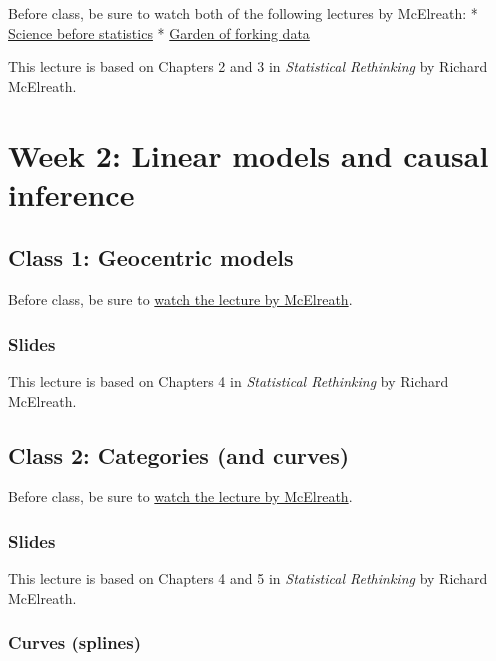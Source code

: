 \documentclass[
]{book}
\begin{document}
Before class, be sure to watch both of the following lectures by McElreath:
* \href{Science\%20Before\%20Statistics}{Science before statistics}
* \href{https://www.youtube.com/watch?v=R1vcdhPBlXA&list=PLDcUM9US4XdPz-KxHM4XHt7uUVGWWVSus&index=2}{Garden of forking data}

This lecture is based on Chapters 2 and 3 in \emph{Statistical Rethinking} by Richard McElreath.

\chapter{Week 2: Linear models and causal inference}\label{week-2-linear-models-and-causal-inference}

\section{Class 1: Geocentric models}\label{class-1-geocentric-models}

Before class, be sure to \href{https://www.youtube.com/watch?v=tNOu-SEacNU&list=PLDcUM9US4XdPz-KxHM4XHt7uUVGWWVSus&index=3}{watch the lecture by McElreath}.

\subsection{Slides}\label{slides-1}

This lecture is based on Chapters 4 in \emph{Statistical Rethinking} by Richard McElreath.

\section{Class 2: Categories (and curves)}\label{class-2-categories-and-curves}

Before class, be sure to \href{https://www.youtube.com/watch?v=F0N4b7K_iYQ&list=PLDcUM9US4XdPz-KxHM4XHt7uUVGWWVSus&index=4}{watch the lecture by McElreath}.

\subsection{Slides}\label{slides-2}

This lecture is based on Chapters 4 and 5 in \emph{Statistical Rethinking} by Richard McElreath.

\subsection{Curves (splines)}\label{curves-splines}
\end{document}
